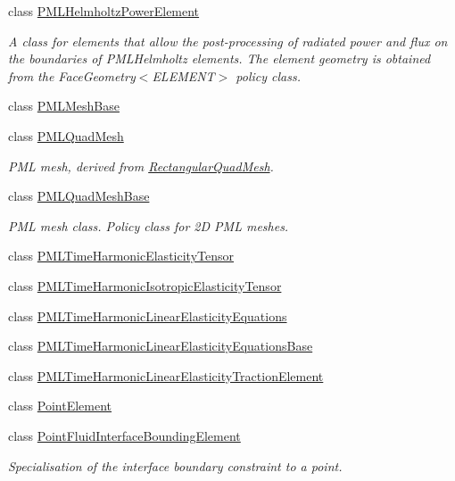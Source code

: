 \begin{DoxyCompactItemize}
class \hyperlink{classoomph_1_1PMLHelmholtzPowerElement}{P\+M\+L\+Helmholtz\+Power\+Element}
\begin{DoxyCompactList}\small\item\em A class for elements that allow the post-\/processing of radiated power and flux on the boundaries of P\+M\+L\+Helmholtz elements. The element geometry is obtained from the Face\+Geometry$<$\+E\+L\+E\+M\+E\+N\+T$>$ policy class. \end{DoxyCompactList}\item 
class \hyperlink{classoomph_1_1PMLMeshBase}{P\+M\+L\+Mesh\+Base}
\item 
class \hyperlink{classoomph_1_1PMLQuadMesh}{P\+M\+L\+Quad\+Mesh}
\begin{DoxyCompactList}\small\item\em P\+ML mesh, derived from \hyperlink{classoomph_1_1RectangularQuadMesh}{Rectangular\+Quad\+Mesh}. \end{DoxyCompactList}\item 
class \hyperlink{classoomph_1_1PMLQuadMeshBase}{P\+M\+L\+Quad\+Mesh\+Base}
\begin{DoxyCompactList}\small\item\em P\+ML mesh class. Policy class for 2D P\+ML meshes. \end{DoxyCompactList}\item 
class \hyperlink{classoomph_1_1PMLTimeHarmonicElasticityTensor}{P\+M\+L\+Time\+Harmonic\+Elasticity\+Tensor}
\item 
class \hyperlink{classoomph_1_1PMLTimeHarmonicIsotropicElasticityTensor}{P\+M\+L\+Time\+Harmonic\+Isotropic\+Elasticity\+Tensor}
\item 
class \hyperlink{classoomph_1_1PMLTimeHarmonicLinearElasticityEquations}{P\+M\+L\+Time\+Harmonic\+Linear\+Elasticity\+Equations}
\item 
class \hyperlink{classoomph_1_1PMLTimeHarmonicLinearElasticityEquationsBase}{P\+M\+L\+Time\+Harmonic\+Linear\+Elasticity\+Equations\+Base}
\item 
class \hyperlink{classoomph_1_1PMLTimeHarmonicLinearElasticityTractionElement}{P\+M\+L\+Time\+Harmonic\+Linear\+Elasticity\+Traction\+Element}
\item 
class \hyperlink{classoomph_1_1PointElement}{Point\+Element}
\item 
class \hyperlink{classoomph_1_1PointFluidInterfaceBoundingElement}{Point\+Fluid\+Interface\+Bounding\+Element}
\begin{DoxyCompactList}\small\item\em Specialisation of the interface boundary constraint to a point. \end{DoxyCompactList}\item 

\end{DoxyCompactItemize}
